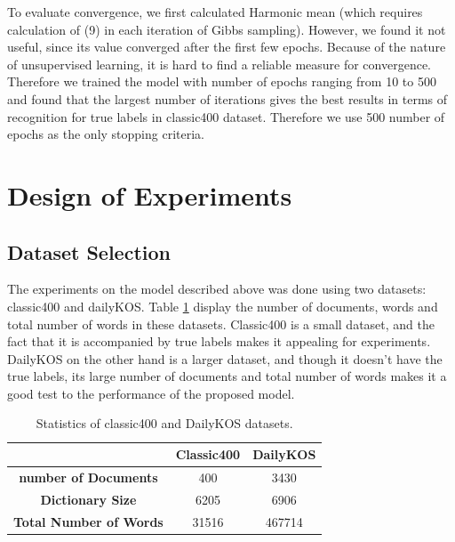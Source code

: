 \documentclass[twoside,12pt]{article}
\begin{document}
To evaluate convergence, we first calculated Harmonic mean (which requires calculation of (9) in each iteration of Gibbs sampling). However, we found it not useful, since its value converged after the first few epochs. Because of the nature of unsupervised learning, it is hard to find a reliable measure for convergence. Therefore we trained the model with number of epochs ranging from 10 to 500 and found that the largest number of iterations gives the best results in terms of recognition for true labels in classic400 dataset. Therefore we use 500 number of epochs as the only stopping criteria.
\section{Design of Experiments}

\subsection{Dataset Selection}
The experiments on the model described above was done using two datasets: classic400 and dailyKOS. Table \ref{tableDatasetStats} display the number of documents, words and total number of words in these datasets. Classic400 is a small dataset, and the fact that it is accompanied by true labels makes it appealing for experiments. DailyKOS on the other hand is a larger dataset, and though it doesn't have the true labels, its large number of documents and total number of words makes it a good test to the performance of the proposed model. 


\begin{table}
\vspace{-2cm}
\center
\begin{tabular}{|c|c|c|}
\hline
 & \textbf{Classic400} & \textbf{DailyKOS} \\
 \hline
\textbf{ number of Documents} & 400 & 3430 \\
\textbf{ Dictionary Size} & 6205 & 6906 \\
\textbf{ Total Number of Words} & 31516 & 467714\\
 \hline
\end{tabular}
\caption{Statistics of classic400 and DailyKOS datasets.}
\label{tableDatasetStats}
\end{table}
\end{document}

